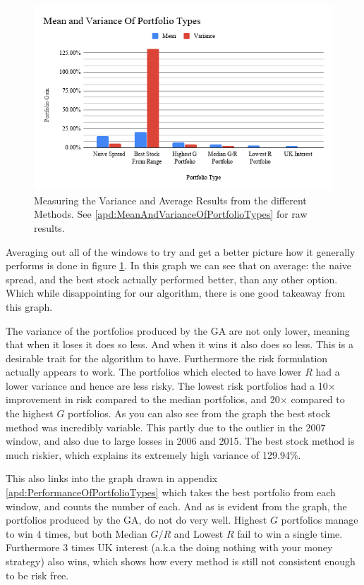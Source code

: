 \documentclass[11pt]{article}
\begin{document}
    \begin{figure}[H] %
        \includegraphics[width=\textwidth]{MeanAndVarianceOfPortfolioTypes}
        \caption{Measuring the Variance and Average Results from the different Methods. See \ref{apd:MeanAndVarianceOfPortfolioTypes} for raw results.}\label{fig:MeanAndVarianceOfPortfolioTypes}
    \end{figure}

    Averaging out all of the windows to try and get a better picture how it generally
    performs is done in figure \ref{fig:MeanAndVarianceOfPortfolioTypes}. In this graph
    we can see that on average: the naive spread, and the best stock actually performed
    better, than any other option. Which while disappointing for our algorithm, there
    is one good takeaway from this graph.

    The variance of the portfolios produced by the GA are not only lower, meaning that
    when it loses it does so less. And when it wins it also does so less. This is a
    desirable trait for the algorithm to have. Furthermore the risk formulation
    actually appears to work. The portfolios which elected to have lower \(R\)
    had a lower variance and hence are less risky. The lowest risk portfolios
    had a 10\(\times\) improvement in risk compared to the median portfolios, and 20\(\times\)
    compared to the highest \(G\) portfolios. As you can also see from the graph the best
    stock method was incredibly variable. This partly due to the outlier in the 2007
    window, and also due to large losses in 2006 and 2015. The best stock method
    is much riskier, which explains its extremely high variance of 129.94\%.

    This also links into the graph drawn in appendix \ref{apd:PerformanceOfPortfolioTypes}
    which takes the best portfolio from each window, and counts the number of each.
    And as is evident from the graph, the portfolios produced by the GA, do not
    do very well. Highest \(G\) portfolios manage to win 4 times, but both
    Median \(G/R\) and Lowest \(R\) fail to win a single time. Furthermore 3
    times UK interest (a.k.a the doing nothing with your money strategy)
    also wins, which shows how every method is still not consistent enough to
    be risk free.
\end{document}
